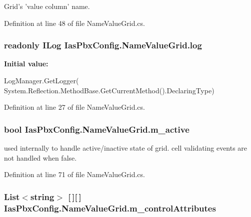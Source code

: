 Grid's 'value column' name. 

Definition at line 48 of file NameValueGrid.cs.\hypertarget{class_ias_pbx_config_1_1_name_value_grid_acdf8c458a67f3fd92adbbe8878b9067d}{
\subsubsection[{log}]{\setlength{\rightskip}{0pt plus 5cm}readonly ILog {\bf IasPbxConfig.NameValueGrid.log}}}
\label{class_ias_pbx_config_1_1_name_value_grid_acdf8c458a67f3fd92adbbe8878b9067d}
{\bfseries Initial value:}
\begin{DoxyCode}
 LogManager.GetLogger(
            System.Reflection.MethodBase.GetCurrentMethod().DeclaringType)
\end{DoxyCode}


Definition at line 27 of file NameValueGrid.cs.\hypertarget{class_ias_pbx_config_1_1_name_value_grid_a0177cb7f2195d16203835db6e41c2823}{
\subsubsection[{m\_\-active}]{\setlength{\rightskip}{0pt plus 5cm}bool {\bf IasPbxConfig.NameValueGrid.m\_\-active}}}
\label{class_ias_pbx_config_1_1_name_value_grid_a0177cb7f2195d16203835db6e41c2823}


used internally to handle active/inactive state of grid. cell validating events are not handled when false. 

Definition at line 71 of file NameValueGrid.cs.\hypertarget{class_ias_pbx_config_1_1_name_value_grid_a57457b107cbaf9464e578effb30a7b5c}{
\subsubsection[{m\_\-controlAttributes}]{\setlength{\rightskip}{0pt plus 5cm}List$<$string$>$ \mbox{[}$\,$\mbox{]}\mbox{[}$\,$\mbox{]} {\bf IasPbxConfig.NameValueGrid.m\_\-controlAttributes}}}
\label{class_ias_pbx_config_1_1_name_value_grid_a57457b107cbaf9464e578effb30a7b5c}


